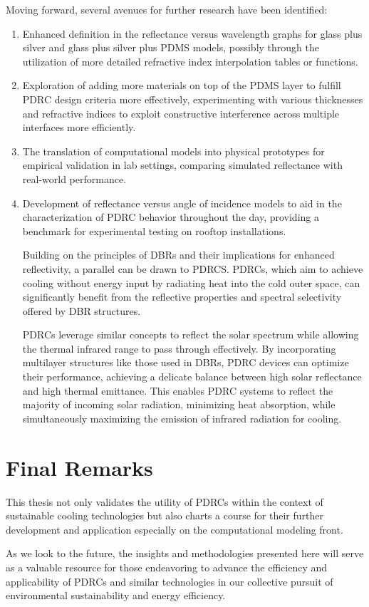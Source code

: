 Moving forward, several avenues for further research have been identified:

\begin{enumerate}
    \item Enhanced definition in the reflectance versus wavelength graphs for glass plus silver and glass plus silver plus PDMS models, possibly through the utilization of more detailed refractive index interpolation tables or functions.
    \item Exploration of adding more materials on top of the PDMS layer to fulfill PDRC design criteria more effectively, experimenting with various thicknesses and refractive indices to exploit constructive interference across multiple interfaces more efficiently.
    \item The translation of computational models into physical prototypes for empirical validation in lab settings, comparing simulated reflectance with real-world performance.
    \item Development of reflectance versus angle of incidence models to aid in the characterization of PDRC behavior throughout the day, providing a benchmark for experimental testing on rooftop installations.





Building on the principles of DBRs and their implications for enhanced reflectivity, a parallel can be drawn to PDRCS. PDRCs, which aim to achieve cooling without energy input by radiating heat into the cold outer space, can significantly benefit from the reflective properties and spectral selectivity offered by DBR structures.

PDRCs leverage similar concepts to reflect the solar spectrum while allowing the thermal infrared range to pass through effectively. By incorporating multilayer structures like those used in DBRs, PDRC devices can optimize their performance, achieving a delicate balance between high solar reflectance and high thermal emittance. This enables PDRC systems to reflect the majority of incoming solar radiation, minimizing heat absorption, while simultaneously maximizing the emission of infrared radiation for cooling.
\end{enumerate}

\section{Final Remarks}

This thesis not only validates the utility of PDRCs within the context of sustainable cooling technologies but also charts a course for their further development and application especially on the computational modeling front.

As we look to the future, the insights and methodologies presented here will serve as a valuable resource for those endeavoring to advance the efficiency and applicability of PDRCs and similar technologies in our collective pursuit of environmental sustainability and energy efficiency.